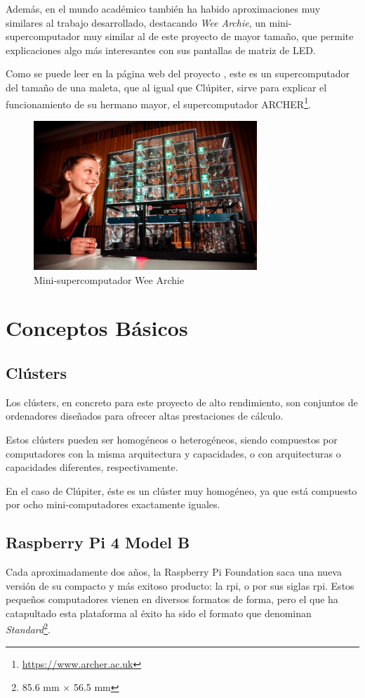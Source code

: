 Además, en el mundo académico también ha habido aproximaciones muy similares al trabajo desarrollado, destacando \textit{Wee Archie}, un mini-supercomputador muy similar al de este proyecto de mayor tamaño, que permite explicaciones algo más interesantes con sus pantallas de matriz de LED.

Como se puede leer en la página web del proyecto \cite{wee_archie_webpage}, este es un supercomputador del tamaño de una maleta, que al igual que Clúpiter, sirve para explicar el funcionamiento de su hermano mayor, el supercomputador ARCHER\footnote{\url{https://www.archer.ac.uk}}.

\begin{figure}[h!]
  \centering
  \includegraphics[width=0.75\textwidth]{img/wee-girl.jpg}
  \caption{Mini-supercomputador Wee Archie}
  \label{fig:wee_archie_girl}
\end{figure}

\section{Conceptos Básicos}
\subsection{Clústers}
Los clústers, en concreto para este proyecto de alto rendimiento, son conjuntos de ordenadores diseñados para ofrecer altas prestaciones de cálculo.

Estos clústers pueden ser homogéneos o heterogéneos, siendo compuestos por computadores con la misma arquitectura y capacidades, o con arquitecturas o capacidades diferentes, respectivamente.

En el caso de Clúpiter, éste es un clúster muy homogéneo, ya que está compuesto por ocho mini-computadores exactamente iguales.

\subsection{Raspberry Pi 4 Model B}
Cada aproximadamente dos años, la Raspberry Pi Foundation saca una nueva versión de su compacto y más exitoso producto: la \acrlong{rpi}, o por sus siglas \acrshort{rpi}. Estos pequeños computadores vienen en diversos formatos de forma, pero el que ha catapultado esta plataforma al éxito ha sido el formato que denominan \textit{Standard}\footnote{85.6 mm × 56.5 mm}.

